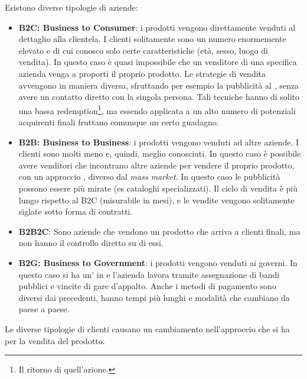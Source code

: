 Esistono diverse tipologie di aziende:
\begin{itemize}
  \item \textbf{B2C: Business to Consumer}: i prodotti vengono direttamente
  venduti al dettaglio alla clientela. I clienti solitamente sono un numero
  enormemente elevato e di cui conosco solo certe caratteristiche (età, sesso,
  luogo di vendita). In questo caso è quasi impossibile che un venditore di una
  specifica azienda venga a proporti il proprio prodotto. Le strategie di
  vendita avvengono in maniera diversa, sfruttando per esempio la pubblicità al
  , senza avere un contatto diretto con la singola 
  persona.
  Tali tecniche hanno di solito una bassa redemption\footnote{Il ritorno di
  quell'azione.}, ma essendo applicata a un alto numero di potenziali
  acquirenti finali fruttano comunque un certo guadagno.

  \item \textbf{B2B: Business to Business}: i prodotti vengono venduti ad altre
  aziende. I clienti sono molti meno e, quindi, meglio conosciuti. In questo
  caso è possibile avere venditori che incontrano altre aziende per vendere il
  proprio prodotto, con un approccio , diverso dal
  \textit{mass market}. In questo caso le pubblicità possono essere più mirate
  (es cataloghi specializzati). Il ciclo di vendita è più lungo rispetto al B2C
  (misurabile in mesi), e le vendite vengono solitamente siglate sotto forma di
  contratti.

  \item \textbf{B2B2C}: Sono aziende che vendono un prodotto che arriva a
  clienti finali, ma non hanno il controllo diretto su di essi.

  \item \textbf{B2G: Business to Government}: i prodotti vengono venduti ai
  governi. In questo caso si ha un' in e l'azienda lavora tramite assegnazione di bandi pubblici e 
  vincite di gare d'appalto. Anche i metodi di pagamento sono diversi dai 
  precedenti, hanno tempi più lunghi e modalità che cambiano da paese a paese.
\end{itemize}

Le diverse tipologie di clienti causano un cambiamento nell'approccio che si ha
per la vendita del prodotto.
